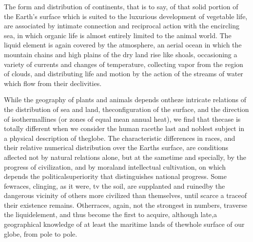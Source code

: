 The form and distribution of continents, that is to say, of that solid portion of the Earth's surface which is suited to the luxurious development of vegetable life, are associated by intimate connection and reciprocal action with the encircling sea, in which organic life is almost entirely limited to the animal world. The liquid element is again covered by the atmosphere, an aerial ocean in which the mountain chains and high plains of the dry land rise like shoals, occasioning a variety of currents and changes of temperature, collecting vapor from the region of clouds, and distributing life and motion by the action of the streams of water which flow from their declivities.

While the geography of plants and animals depends ontheze intricate relations of the distribution of sea and land, theconfiguration of the surface, and the direction of isothermallines (or zones of equal mean annual heat), we find that thecase is totally different when we consider the human racethe last and noblest subject in a physical description of theglobe. The characteristic differences in races, and their relative numerical distribution over the Earths surface, are conditions aflected not by natural relations alone, but at the sametime and specially, by the progress of civilization, and by moraland intellectual cultivation, on which depends the politicalsuperiority that distinguishes national progress. Some fewraces, clinging, as it were, tv the soil, are supplanted and ruinedby the dangerous vicinity of others more civilized than themselves, until scarce a traceof their existence remains. Otherraces, again, not the strongest in numbers, traverse the liquidelement, and thus become the first to acquire, although late,a geographical knowledge of at least the maritime lands of thewhole surface of our globe, from pole to pole.

